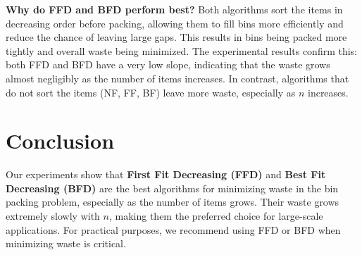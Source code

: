 \documentclass[12pt]{article}
\begin{document}
\textbf{Why do FFD and BFD perform best?} Both algorithms sort the items in decreasing order before packing, allowing them to fill bins more efficiently and reduce the chance of leaving large gaps. This results in bins being packed more tightly and overall waste being minimized. The experimental results confirm this: both FFD and BFD have a very low slope, indicating that the waste grows almost negligibly as the number of items increases. In contrast, algorithms that do not sort the items (NF, FF, BF) leave more waste, especially as $n$ increases.

\section{Conclusion}

Our experiments show that \textbf{First Fit Decreasing (FFD)} and \textbf{Best Fit Decreasing (BFD)} are the best algorithms for minimizing waste in the bin packing problem, especially as the number of items grows. Their waste grows extremely slowly with $n$, making them the preferred choice for large-scale applications. For practical purposes, we recommend using FFD or BFD when minimizing waste is critical.
\end{document}
